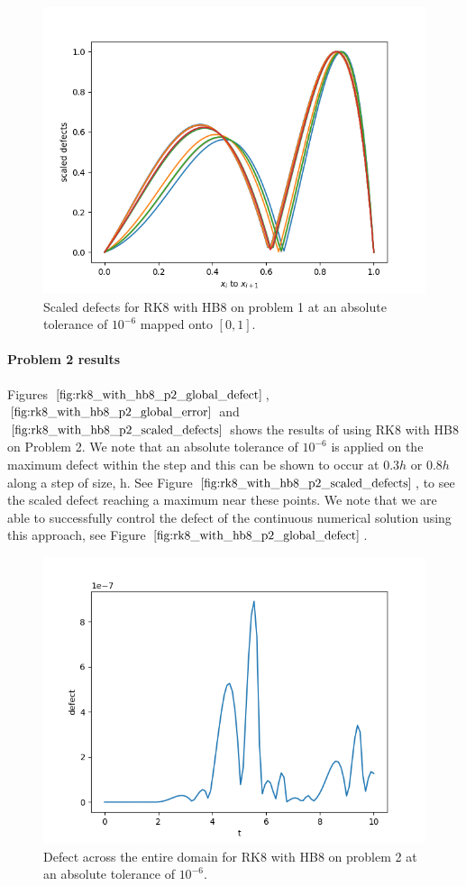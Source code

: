 \begin{figure}[H]
\centering
\includegraphics[width=0.7\linewidth]{./figures/rk8_with_hb8_p1_scaled_defects}
\caption{Scaled defects for RK8 with HB8 on problem 1 at an absolute tolerance of $10^{-6}$  mapped onto $[0, 1]$.}
\label{fig:rk8_with_hb8_p1_scaled_defects}
\end{figure}

\paragraph{Problem 2 results}
Figures $\ref{fig:rk8_with_hb8_p2_global_defect}$, $\ref{fig:rk8_with_hb8_p2_global_error}$ and $\ref{fig:rk8_with_hb8_p2_scaled_defects}$ shows the results of using RK8 with HB8 on Problem 2. We note that an absolute tolerance of $10^{-6}$ is applied on the maximum defect within the step and this can be shown to occur at $0.3h$ or $0.8h$ along a step of size, h. See Figure $\ref{fig:rk8_with_hb8_p2_scaled_defects}$, to see the scaled defect reaching a maximum near these points. We note that we are able to successfully control the defect of the continuous numerical solution using this approach, see Figure $\ref{fig:rk8_with_hb8_p2_global_defect}$. 

\begin{figure}[H]
\centering
\includegraphics[width=0.7\linewidth]{./figures/rk8_with_hb8_p2_global_defect}
\caption{Defect across the entire domain for RK8 with HB8 on problem 2 at an absolute tolerance of $10^{-6}$.}
\label{fig:rk8_with_hb8_p2_global_defect}
\end{figure}


